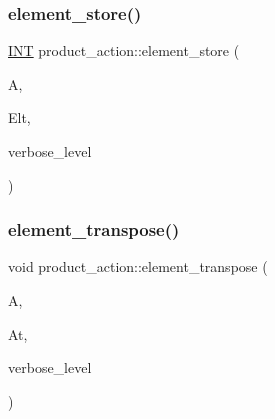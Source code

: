 \mbox{\label{classproduct__action_af09e17711565cdfb825fa56a8ee06809}} 
\subsubsection{\texorpdfstring{element\+\_\+store()}{element\_store()}}
{\footnotesize\ttfamily \mbox{\hyperlink{galois_8h_a09fddde158a3a20bd2dcadb609de11dc}{I\+NT}} product\+\_\+action\+::element\+\_\+store (\begin{DoxyParamCaption}\item[{\mbox{\hyperlink{classaction}{action}} $\ast$}]{A,  }\item[{\mbox{\hyperlink{galois_8h_a09fddde158a3a20bd2dcadb609de11dc}{I\+NT}} $\ast$}]{Elt,  }\item[{\mbox{\hyperlink{galois_8h_a09fddde158a3a20bd2dcadb609de11dc}{I\+NT}}}]{verbose\+\_\+level }\end{DoxyParamCaption})}

\mbox{\label{classproduct__action_aa84df17c662d1a9944325d9bfba37069}} 
\subsubsection{\texorpdfstring{element\+\_\+transpose()}{element\_transpose()}}
{\footnotesize\ttfamily void product\+\_\+action\+::element\+\_\+transpose (\begin{DoxyParamCaption}\item[{\mbox{\hyperlink{galois_8h_a09fddde158a3a20bd2dcadb609de11dc}{I\+NT}} $\ast$}]{A,  }\item[{\mbox{\hyperlink{galois_8h_a09fddde158a3a20bd2dcadb609de11dc}{I\+NT}} $\ast$}]{At,  }\item[{\mbox{\hyperlink{galois_8h_a09fddde158a3a20bd2dcadb609de11dc}{I\+NT}}}]{verbose\+\_\+level }\end{DoxyParamCaption})}

\mbox{\label{classproduct__action_a1abc32fd5b63be67d5480c977ae357b4}} 
